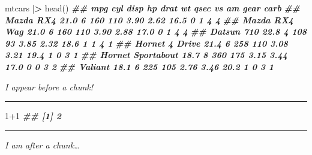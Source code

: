 \documentclass[
  11pt,
]{article}
\newenvironment{Shaded}{\begin{snugshade}}{\end{snugshade}}
\newcommand{\AttributeTok}[1]{\textcolor[rgb]{0.77,0.63,0.00}{#1}}
\newcommand{\CommentTok}[1]{\textcolor[rgb]{0.56,0.35,0.01}{\textit{#1}}}
\newcommand{\ControlFlowTok}[1]{\textcolor[rgb]{0.13,0.29,0.53}{\textbf{#1}}}
\newcommand{\DecValTok}[1]{\textcolor[rgb]{0.00,0.00,0.81}{#1}}
\newcommand{\DocumentationTok}[1]{\textcolor[rgb]{0.56,0.35,0.01}{\textbf{\textit{#1}}}}
\newcommand{\ErrorTok}[1]{\textcolor[rgb]{0.64,0.00,0.00}{\textbf{#1}}}
\newcommand{\FunctionTok}[1]{\textcolor[rgb]{0.00,0.00,0.00}{#1}}
\newcommand{\NormalTok}[1]{#1}
\newcommand{\SpecialCharTok}[1]{\textcolor[rgb]{0.00,0.00,0.00}{#1}}
\newcommand{\StringTok}[1]{\textcolor[rgb]{0.31,0.60,0.02}{#1}}
\begin{document}
\tiny

\begin{Shaded}
\begin{Highlighting}[]
\NormalTok{mtcars }\SpecialCharTok{|}\ErrorTok{\textgreater{}} \FunctionTok{head}\NormalTok{()}
      \DocumentationTok{\#\#                    mpg cyl disp  hp drat   wt qsec vs am gear carb}
      \DocumentationTok{\#\# Mazda RX4         21.0   6  160 110 3.90 2.62 16.5  0  1    4    4}
      \DocumentationTok{\#\# Mazda RX4 Wag     21.0   6  160 110 3.90 2.88 17.0  0  1    4    4}
      \DocumentationTok{\#\# Datsun 710        22.8   4  108  93 3.85 2.32 18.6  1  1    4    1}
      \DocumentationTok{\#\# Hornet 4 Drive    21.4   6  258 110 3.08 3.21 19.4  1  0    3    1}
      \DocumentationTok{\#\# Hornet Sportabout 18.7   8  360 175 3.15 3.44 17.0  0  0    3    2}
      \DocumentationTok{\#\# Valiant           18.1   6  225 105 2.76 3.46 20.2  1  0    3    1}
\end{Highlighting}
\end{Shaded}

\normalsize

\begin{Shaded}
\end{Shaded}

\tiny \emph{I appear before a chunk!}

\hrule

\begin{Shaded}
\begin{Highlighting}[]
\DecValTok{1}\SpecialCharTok{+}\DecValTok{1}
      \DocumentationTok{\#\# [1] 2}
\end{Highlighting}
\end{Shaded}

\hrule

\normalsize  

\emph{I am after a chunk\ldots{}}
\end{document}
